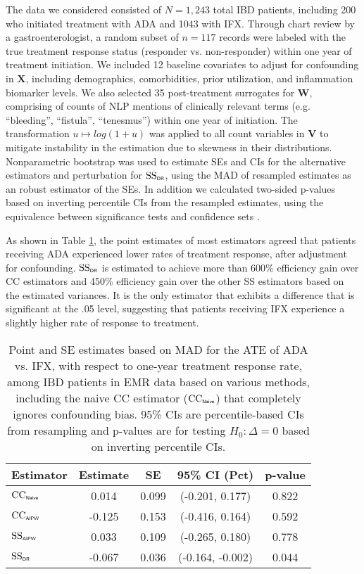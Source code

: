 \documentclass[useAMS,referee,usenatbib]{biom}
\def\bX{\mathbf{X}}
\def\bW{\mathbf{W}}
\def\bV{\mathbf{V}}
\def\SSDR{\mbox{SS}_{\sf \scriptscriptstyle DR}}
\def\CCDR{\mbox{CC}_{\sf \scriptscriptstyle AIPW}}
\def\CCNaive{\mbox{CC}_{\sf \scriptscriptstyle Naive}}
\def\SSPrePost{\mbox{SS}_{\sf \scriptscriptstyle AIPW}}
\begin{document}
The data we considered consisted of $N=1,243$ total IBD patients, including 200 who initiated treatment with ADA and 1043 with IFX.  Through chart review by a gastroenterologist, a random subset of $n=117$ records were labeled with the true treatment response status (responder vs. non-responder) within one year of treatment initiation.  We included 12 baseline covariates to adjust for confounding in $\bX$, including demographics, comorbidities, prior utilization, and inflammation biomarker levels.  We also selected 35 post-treatment surrogates for $\bW$, comprising of counts of NLP mentions of clinically relevant terms (e.g. ``bleeding'', ``fistula'', ``tenesmus'') within one year of initiation.  The transformation $u \mapsto log(1+u)$ was applied to all count variables in $\bV$ to mitigate instability in the estimation due to skewness in their distributions.  Nonparametric bootstrap was used to estimate SEs and CIs for the alternative estimators and perturbation for $\SSDR$, using the MAD of resampled estimates as an robust estimator of the SEs.  In addition we calculated two-sided p-values based on inverting percentile CIs from the resampled estimates, using the equivalence between significance tests and confidence sets \citep{liu1997notions}.

As shown in Table \ref{tab:data}, the point estimates of most estimators agreed that patients receiving ADA experienced 
lower rates of treatment response, after adjustment for confounding.  $\SSDR$ is estimated to achieve more than 600\% 
efficiency gain over CC estimators and 450\% efficiency gain over the other SS estimators based on the estimated variances.  
It is the only estimator that exhibits a difference that is significant at the .05 level, suggesting that 
patients receiving IFX experience a slightly higher rate of response to treatment.

\begin{table}[h!]
\caption{Point and SE estimates based on MAD for the ATE of ADA vs. IFX, with respect to one-year treatment response rate, among IBD patients in EMR data based on various methods, including the naive CC estimator ($\CCNaive$) that completely ignores confounding bias. 
95\% CIs are percentile-based CIs from resampling and p-values are for testing $H_0: \Delta=0$ based on inverting percentile CIs.}
\label{tab:data}
\begin{center}
\begin{tabular}{lcccc}
    \toprule
    \textbf{Estimator} & \textbf{Estimate} & \textbf{SE} & \textbf{95\% CI (Pct)} & \textbf{p-value} \\
    \midrule
    $\CCNaive$ & 0.014 & 0.099 & (-0.201, 0.177) & 0.822 \\
    $\CCDR$ & -0.125 & 0.153 & (-0.416, 0.164) & 0.592 \\
    $\SSPrePost$ & 0.033 & 0.109 & (-0.265, 0.180) & 0.778 \\
    $\SSDR$ & -0.067 & 0.036 & (-0.164, -0.002) & 0.044 \\
    \bottomrule
\end{tabular}
\end{center}
\end{table}
\end{document}
